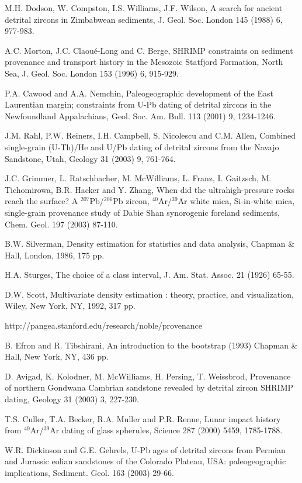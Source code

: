\documentclass[12]{article}
\begin{document}
\begin{thebibliography}{}

 M.H.  Dodson,  W.  Compston, I.S.  Williams, J.F.
Wilson, A search for ancient detrital zircons in Zimbabwean sediments,
J.  Geol. Soc. London 145 (1988) 6, 977-983.

  A.C.   Morton,   J.C.   Claou\'{e}-Long  and  C.
Berge, SHRIMP constraints on sediment provenance and transport history
in the Mesozoic Statfjord Formation,  North Sea, J.  Geol. Soc. London
153 (1996) 6, 915-929.

  P.A. Cawood  and  A.A. Nemchin,  Paleogeographic
development  of  the East  Laurentian  margin;  constraints from  U-Pb
dating   of  detrital  zircons   in  the   Newfoundland  Appalachians,
Geol. Soc. Am. Bull. 113 (2001) 9, 1234-1246.

   J.M.   Rahl,   P.W.   Reiners,   I.H.   Campbell,
S. Nicolescu and C.M.  Allen, Combined single-grain (U-Th)/He and U/Pb
dating of detrital zircons from the Navajo Sandstone, Utah, Geology 31
(2003) 9, 761-764.

  J.C. Grimmer,  L. Ratschbacher,  M. McWilliams,
L. Franz, I. Gaitzsch, M.  Tichomirowa, B.R. Hacker and Y. Zhang, When
did   the    ultrahigh-pressure   rocks   reach    the   surface?    A
$^{207}$Pb/$^{206}$Pb   zircon,    $^{40}$Ar/$^{39}$Ar   white   mica,
Si-in-white  mica,   single-grain  provenance  study   of  Dabie  Shan
synorogenic foreland sediments, Chem. Geol. 197 (2003) 87-110.

B.W.    Silverman,   Density   estimation   for
statistics and data analysis, Chapman \& Hall, London, 1986, 175 pp.

 H.A.   Sturges, The choice of  a class interval,
J. Am. Stat. Assoc. 21 (1926) 65-55.

  D.W.  Scott,  Multivariate  density estimation  :
theory, practice,  and visualization, Wiley,  New York, NY,  1992, 317
pp.

 \mbox{http://pangea.stanford.edu/research/noble/provenance}

 B. Efron and R. Tibshirani, An introduction to the
bootstrap (1993) Chapman \& Hall, New York, NY, 436 pp.

  D.   Avigad, K.   Kolodner,  M.  McWilliams,  H.
Persing,  T.   Weissbrod,  Provenance  of northern  Gondwana  Cambrian
sandstone revealed by detrital zircon SHRIMP dating, Geology 31 (2003)
3, 227-230.

 T.S.  Culler, T.A.  Becker, R.A.  Muller and P.R.
Renne, Lunar  impact history from $^{40}$Ar/$^{39}$Ar  dating of glass
spherules, Science 287 (2000) 5459, 1785-1788.

 W.R. Dickinson and  G.E. Gehrels, U-Pb ages of
detrital zircons  from Permian and  Jurassic eolian sandstones  of the
Colorado   Plateau,  USA:   paleogeographic   implications,  Sediment.
Geol. 163 (2003) 29-66.

\end{thebibliography}
\end{document}
